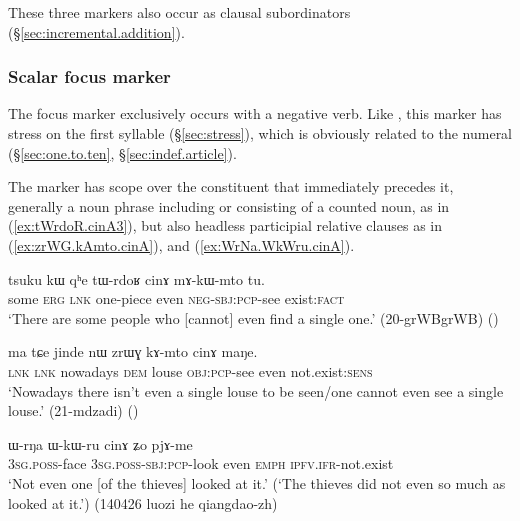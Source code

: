 These three markers also occur as clausal subordinators (§\ref{sec:incremental.addition}).
 
 
 \subsubsection{Scalar focus marker } \label{sec:cinA} 
 The focus marker  exclusively occurs with a negative verb. Like , this marker has stress on the first syllable  (§\ref{sec:stress}), which is obviously related to the numeral  (§\ref{sec:one.to.ten}, §\ref{sec:indef.article}).
 
 The marker  has scope over the constituent that immediately precedes it, generally a noun phrase including or consisting of a counted noun, as in (\ref{ex:tWrdoR.cinA3}), but also headless participial relative clauses as in (\ref{ex:zrWG.kAmto.cinA}), and (\ref{ex:WrNa.WkWru.cinA}).
 
 \begin{exe}
\ex \label{ex:tWrdoR.cinA3}
\gll tsuku kɯ qʰe tɯ-rdoʁ cinɤ mɤ-kɯ-mto tu. \\
some \textsc{erg} \textsc{lnk} one-piece even \textsc{neg}-\textsc{sbj}:\textsc{pcp}-see exist:\textsc{fact} \\
\glt `There are some people who [cannot] even find a single one.' (20-grWBgrWB)
()
 \end{exe} 
 
 \begin{exe}
\ex \label{ex:zrWG.kAmto.cinA}
\gll  ma tɕe jinde nɯ zrɯɣ kɤ-mto cinɤ maŋe. \\
\textsc{lnk} \textsc{lnk} nowadays \textsc{dem} louse \textsc{obj}:\textsc{pcp}-see even not.exist:\textsc{sens} \\
\glt `Nowadays there isn't even a single louse to be seen/one cannot even see a single louse.' (21-mdzadi)
()
\end{exe} 

\begin{exe}
\ex \label{ex:WrNa.WkWru.cinA}
\gll ɯ-rŋa ɯ-kɯ-ru cinɤ ʑo pjɤ-me \\
\textsc{3sg}.\textsc{poss}-face \textsc{3sg}.\textsc{poss}-\textsc{sbj}:\textsc{pcp}-look even \textsc{emph} \textsc{ipfv}.\textsc{ifr}-not.exist \\
\glt `Not even one [of the thieves] looked at it.' (`The thieves did not even so much as looked at it.') (140426 luozi he qiangdao-zh)
\end{exe}

